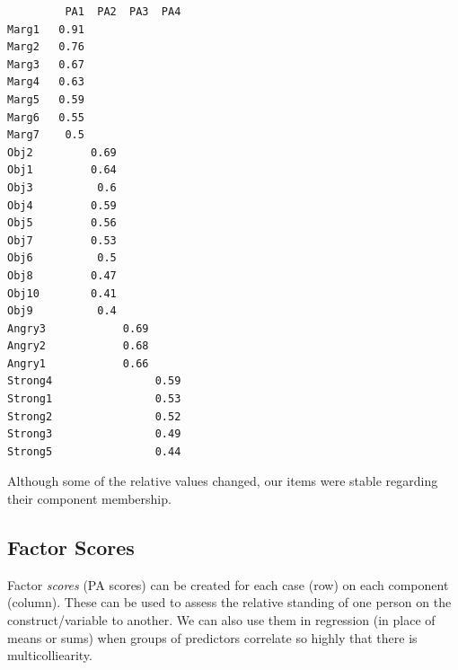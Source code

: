 \documentclass[
  english,
]{book}
\newenvironment{Shaded}{\begin{snugshade}}{\end{snugshade}}
\newcommand{\CommentTok}[1]{\textcolor[rgb]{0.56,0.35,0.01}{\textit{#1}}}
\newcommand{\ControlFlowTok}[1]{\textcolor[rgb]{0.13,0.29,0.53}{\textbf{#1}}}
\newcommand{\DataTypeTok}[1]{\textcolor[rgb]{0.13,0.29,0.53}{#1}}
\newcommand{\DecValTok}[1]{\textcolor[rgb]{0.00,0.00,0.81}{#1}}
\newcommand{\FloatTok}[1]{\textcolor[rgb]{0.00,0.00,0.81}{#1}}
\newcommand{\KeywordTok}[1]{\textcolor[rgb]{0.13,0.29,0.53}{\textbf{#1}}}
\newcommand{\NormalTok}[1]{#1}
\newcommand{\OperatorTok}[1]{\textcolor[rgb]{0.81,0.36,0.00}{\textbf{#1}}}
\newcommand{\StringTok}[1]{\textcolor[rgb]{0.31,0.60,0.02}{#1}}
\begin{document}
\begin{Shaded}
\end{Shaded}

\begin{verbatim}
         PA1  PA2  PA3  PA4
Marg1   0.91               
Marg2   0.76               
Marg3   0.67               
Marg4   0.63               
Marg5   0.59               
Marg6   0.55               
Marg7    0.5               
Obj2         0.69          
Obj1         0.64          
Obj3          0.6          
Obj4         0.59          
Obj5         0.56          
Obj7         0.53          
Obj6          0.5          
Obj8         0.47          
Obj10        0.41          
Obj9          0.4          
Angry3            0.69     
Angry2            0.68     
Angry1            0.66     
Strong4                0.59
Strong1                0.53
Strong2                0.52
Strong3                0.49
Strong5                0.44
\end{verbatim}

Although some of the relative values changed, our items were stable regarding their component membership.

\hypertarget{factor-scores}{%
\subsection{Factor Scores}\label{factor-scores}}

Factor \emph{scores} (PA scores) can be created for each case (row) on each component (column). These can be used to assess the relative standing of one person on the construct/variable to another. We can also use them in regression (in place of means or sums) when groups of predictors correlate so highly that there is multicolliearity.
\end{document}
